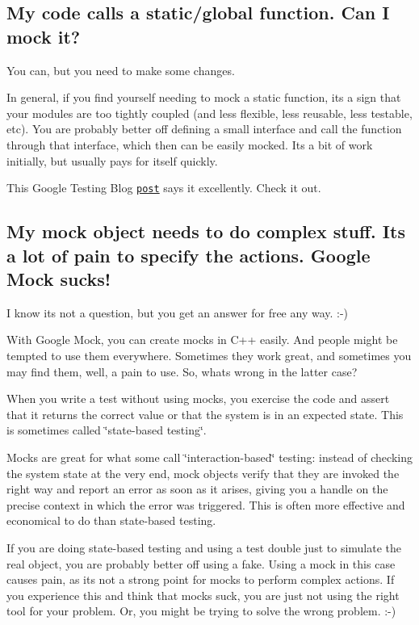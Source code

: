 \subsection*{My code calls a static/global function. Can I mock it?}

You can, but you need to make some changes.

In general, if you find yourself needing to mock a static function, it\textquotesingle{}s a sign that your modules are too tightly coupled (and less flexible, less reusable, less testable, etc). You are probably better off defining a small interface and call the function through that interface, which then can be easily mocked. It\textquotesingle{}s a bit of work initially, but usually pays for itself quickly.

This Google Testing Blog \href{http://googletesting.blogspot.com/2008/06/defeat-static-cling.html}{\tt post} says it excellently. Check it out.

\subsection*{My mock object needs to do complex stuff. It\textquotesingle{}s a lot of pain to specify the actions. Google Mock sucks!}

I know it\textquotesingle{}s not a question, but you get an answer for free any way. \+:-\/)

With Google Mock, you can create mocks in C++ easily. And people might be tempted to use them everywhere. Sometimes they work great, and sometimes you may find them, well, a pain to use. So, what\textquotesingle{}s wrong in the latter case?

When you write a test without using mocks, you exercise the code and assert that it returns the correct value or that the system is in an expected state. This is sometimes called \char`\"{}state-\/based testing\char`\"{}.

Mocks are great for what some call \char`\"{}interaction-\/based\char`\"{} testing\+: instead of checking the system state at the very end, mock objects verify that they are invoked the right way and report an error as soon as it arises, giving you a handle on the precise context in which the error was triggered. This is often more effective and economical to do than state-\/based testing.

If you are doing state-\/based testing and using a test double just to simulate the real object, you are probably better off using a fake. Using a mock in this case causes pain, as it\textquotesingle{}s not a strong point for mocks to perform complex actions. If you experience this and think that mocks suck, you are just not using the right tool for your problem. Or, you might be trying to solve the wrong problem. \+:-\/)

